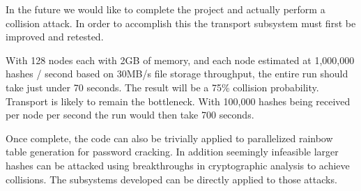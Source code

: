 In the future we would like to complete the project and actually perform 
a collision attack. In order to accomplish this the transport subsystem
must first be improved and retested. 

With 128 nodes each with 2GB of memory, and each node estimated at 
1,000,000 hashes / second based on 30MB/s file storage throughput, 
the entire run should take just under 70 seconds. The result will be a 75\%
collision probability. Transport is likely to remain the bottleneck. With
100,000 hashes being received per node per second the run would then take 700 seconds.

Once complete, the code can also be trivially applied to parallelized rainbow
table generation for password cracking. In addition seemingly infeasible larger hashes
can be attacked using breakthroughs in cryptographic analysis to achieve collisions.
The subsystems developed can be directly applied to those attacks.
